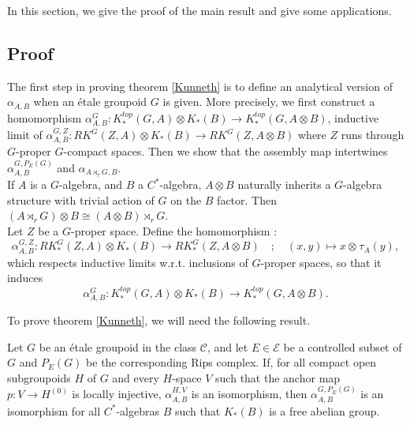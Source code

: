 In this section, we give the proof of the main result and give some applications.	

\subsection{Proof}

The first step in proving theorem \ref{Kunneth} is to define an analytical version of $\alpha_{A,B}$ when an étale groupoid $G$ is given. More precisely, we first construct a homomorphism $\alpha_{A,B}^G : K_*^{top}(G,A)\otimes K_*(B)\rightarrow K_*^{top}(G,A\otimes B )$, inductive limit of $\alpha_{A,B}^{G,Z} : RK^G(Z,A)\otimes K_*(B)\rightarrow RK^G(Z,A\otimes B )$ where $Z$ runs through $G$-proper $G$-compact spaces. Then we show that the assembly map intertwines $\alpha^{G,P_E(G)}_{A,B}$ and $\alpha_{A\rtimes_r G,B}$.\\

If $A$ is a $G$-algebra, and $B$ a $C^*$-algebra, $A\otimes B$ naturally inherits a $G$-algebra structure with trivial action of $G$ on the $B$ factor. Then $(A\rtimes_r G)\otimes B \cong (A\otimes B)\rtimes_r G$.\\

Let $Z$ be a $G$-proper space. Define the homomorphism :
\[\alpha_{A,B}^{G,Z} : RK^G_*(Z,A)\otimes K_*(B)\rightarrow RK_*^G(Z,A\otimes B) \quad ; \quad (x,y)\mapsto x\otimes_{}   \tau_A(y),\]
which respects inductive limits w.r.t. inclusions of $G$-proper spaces, so that it induces
\[\alpha_{A,B}^G : K_*^{top}(G,A)\otimes K_*(B)\rightarrow K_*^{top}(G,A\otimes B ).\]

To prove theorem \ref{Kunneth}, we will need the following result.

\begin{thm}\label{TopologicalKunneth}
Let $G$ be an étale groupoid in the class $\mathcal C$, and let $E\in\mathcal E$ be a controlled subset of $G$ and $P_E(G)$ be the corresponding Rips complex. If, for all compact open subgroupoids $H$ of $G$ and every $H$-space $V$ such that the anchor map $p : V\rightarrow H^{(0)}$ is locally injective, $\alpha_{A,B}^{H,V}$ is an isomorphism, then $\alpha_{A,B}^{G,P_E(G)}$ is an isomorphism for all $C^*$-algebras $B$ such that $K_*(B)$ is a free abelian group.
\end{thm}

